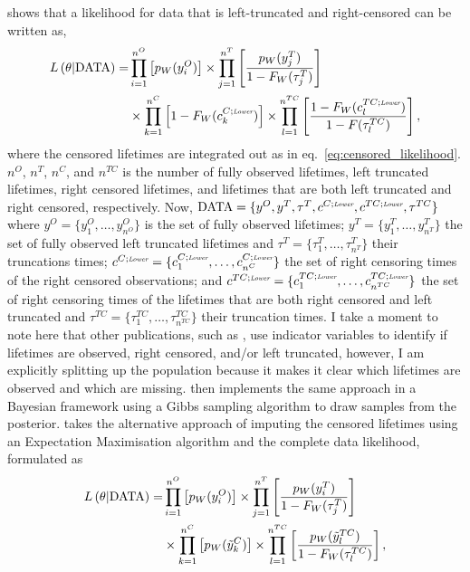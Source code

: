 \citet{hong2009} shows that a likelihood for data that is left-truncated and right-censored can be written as,
\begin{align}
    \label{eq:left_trunc_and_right_cens_int}
    L\left(\theta|\hbox{DATA}\right) = & 
    \prod^{n^O}_{i = 1}\left[p_W(y^O_i) \right] \times
    \prod^{n^T}_{j = 1}\left[\frac{p_W(y^T_j)}{1 - F_W(\tau^T_j)} \right] \\
    & \times \prod^{n^C}_{k = 1}\left[1 - F_W(c^{C;\textit{\tiny{Lower}}}_k)\right]
    \times \prod^{n^{TC}}_{l = 1}\left[\frac{1 - F_W(c^{TC; \textit{\tiny{Lower}}}_l)}{1 - F(\tau^{TC}_l)}\right] \nonumber,
\end{align}
where the censored lifetimes are integrated out as in eq.~\eqref{eq:censored_likelihood}. $n^O$, $n^T$, $n^C$, and $n^{TC}$ is the number of fully observed lifetimes, left truncated lifetimes, right censored lifetimes, and lifetimes that are both left truncated and right censored, respectively. Now, $\text{DATA} = \{y^O, y^T, \tau^T, c^{C;\textit{\tiny{Lower}}}, c^{TC;\textit{\tiny{Lower}}}, \tau^{TC}\}$ where $y^O = \{y^O_1, \dots, y^O_{n^O}\}$ is the set of fully observed lifetimes; $y^T = \{y^T_1, \dots, y^T_{n^T}\}$ the set of fully observed left truncated lifetimes and $\tau^T = \{\tau^T_1, \dots, \tau^T_{n^T}\}$ their truncations times; $c^{C;\textit{\tiny{Lower}}} = \{c^{C;\textit{\tiny{Lower}}}_1, \dots, c^{C;\textit{\tiny{Lower}}}_{n^C}\}$ the set of right censoring times of the right censored observations; and $c^{TC;\textit{\tiny{Lower}}} = \{c^{TC;\textit{\tiny{Lower}}}_1, \dots, c^{TC;\textit{\tiny{Lower}}}_{n^{TC}}\}$ the set of right censoring times of the lifetimes that are both right censored and left truncated and $\tau^{TC} = \{\tau^{TC}_1, \dots, \tau^{TC}_{n^{TC}}\}$ their truncation times. I take a moment to note here that other publications, such as \citet{hong2009}, use indicator variables to identify if lifetimes are observed, right censored, and/or left truncated, however, I am explicitly splitting up the population because it makes it clear which lifetimes are observed and which are missing. \citet{kundu2016} then implements the same approach in a Bayesian framework using a Gibbs sampling algorithm to draw samples from the posterior. \citet{mitra2013} takes the alternative approach of imputing the censored lifetimes using an Expectation Maximisation algorithm and the complete data likelihood, formulated as
\begin{align}
    \label{eq:left_trunc_and_right_cens_imp}
    L\left(\theta|\hbox{DATA}\right) = & 
    \prod^{n^O}_{i = 1}\left[p_W(y^O_i) \right] \times
    \prod^{n^T}_{j = 1}\left[\frac{p_W(y^T_i)}{1 - F_W(\tau^T_j)} \right] \\
    & \times \prod^{n^C}_{k = 1}\left[p_W(\tilde{y}^C_k)\right]
    \times \prod^{n^{TC}}_{l = 1}\left[\frac{p_W(\tilde{y}^{TC}_l)}{1 - F_W(\tau^{TC}_l)}\right] \nonumber,
\end{align}
